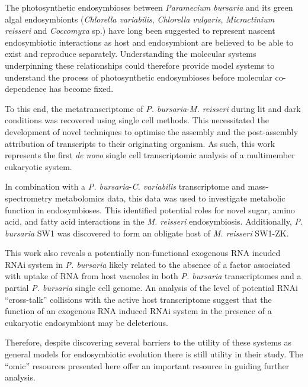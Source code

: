 The photosynthetic endosymbioses between \textit{Paramecium bursaria} and 
its green algal endosymbionts (\textit{Chlorella variabilis}, \textit{Chlorella vulgaris},
\textit{Micractinium reisseri} and \textit{Coccomyxa} sp.) 
have long been suggested to represent 
nascent endosymbiotic interactions as host and endosymbiont are believed
to be able to exist and reproduce separately.  
Understanding the molecular systems underpinning these relationships could therefore
provide model systems to understand the process of photosynthetic endosymbioses 
before molecular
co-dependence has become fixed.  

To this end, the  metatranscriptome of \textit{P. bursaria}-\textit{M. reisseri}
during lit and dark conditions was recovered using single cell methods. 
This necessitated the development of novel techniques to optimise the 
assembly and the post-assembly attribution of transcripts to their originating organism.
As such, this work represents the first \textit{de novo} single cell transcriptomic analysis
of a multimember eukaryotic system.  

In combination with a \textit{P. bursaria}-\textit{C. variabilis}
transcriptome and mass-spectrometry metabolomics data, this 
data was used to investigate metabolic function in endosymbioses. 
This identified potential roles for novel sugar, amino acid, 
and fatty acid interactions in the \textit{M. reisseri} endosymbiosis.
Additionally, \textit{P. bursaria} SW1 was discovered to form an obligate host of 
\textit{M. reisseri} SW1-ZK.


This work also reveals a potentially non-functional exogenous RNA incuded RNAi system in 
\textit{P. bursaria} likely related to the absence of a factor associated with uptake
of RNA from host vacuoles in both \textit{P. bursaria} transcriptomes and a partial
\textit{P. bursaria} single cell genome.  An analysis of the level of potential RNAi ``cross-talk''
collisions with the active host transcriptome 
suggest that the function of an exogenous RNA induced RNAi system in the presence
of a eukaryotic endosymbiont may be deleterious. 


Therefore, despite discovering several barriers to the utility of
these systems as general models for endosymbiotic evolution
there is still utility in their study.
The ``omic'' resources presented here offer an important 
resource in guiding further analysis.
